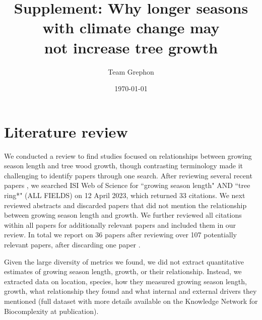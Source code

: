 \documentclass[11pt]{article}
\begin{document}
\renewcommand{\refname}{\CHead{}}


\title{Supplement: Why longer seasons with climate change may\\ not increase tree growth}
\author{Team Grephon}
\date{\today}
\maketitle

\renewcommand{\thetable}{S\arabic{table}}
\renewcommand{\thefigure}{S\arabic{figure}}


\section*{Literature review}

We conducted a review to find studies focused on relationships between growing season length and tree wood growth, though contrasting terminology made it challenging to identify papers through one search. After reviewing several recent papers \citep{dow2022warm,zohner2023effect}, we searched ISI Web of Science for ``growing season length" AND ``tree ring*" (ALL FIELDS) on 12 April 2023, which returned 33 citations. We next reviewed abstracts and discarded papers that did not mention the relationship between growing season length and growth. We further reviewed all citations within all papers for additionally relevant papers and included them in our review. In total we report on 36 papers after reviewing over 107 potentially relevant papers, after discarding one paper \citep[][which used tree lines as a metric of both growth and growing season length]{bruening2017}. %

Given the large diversity of metrics we found, we did not extract quantitative estimates of growing season length, growth, or their relationship. Instead, we extracted data on location, species, how they measured growing season length, growth, what relationship they found and what internal and external drivers they mentioned (full dataset with more details available on the Knowledge Network for Biocomplexity at publication).
\end{document}

